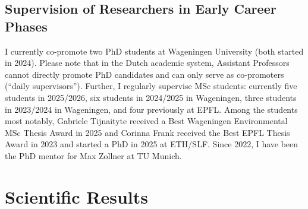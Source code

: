 \documentclass{scrartcl}
\begin{document}
\subsection*{Supervision of Researchers in Early Career Phases}
I currently co-promote two PhD students at Wageningen University (both started in 2024). Please note that in the Dutch academic system, Assistant Professors cannot directly promote PhD candidates and can only serve as co-promoters (``daily supervisors''). Further, I regularly supervise MSc students: currently five students in 2025/2026, six students in 2024/2025 in Wageningen, three students in 2023/2024 in Wageningen, and four previously at EPFL. Among the students most notably, Gabriele Tijnaityte received a Best Wageningen Environmental MSc Thesis Award in 2025 and Corinna Frank received the Best EPFL Thesis Award in 2023 and started a PhD in 2025 at ETH/SLF. Since 2022, I have been the PhD mentor for Max Zollner at TU Munich.

\section*{Scientific Results}
\end{document}
